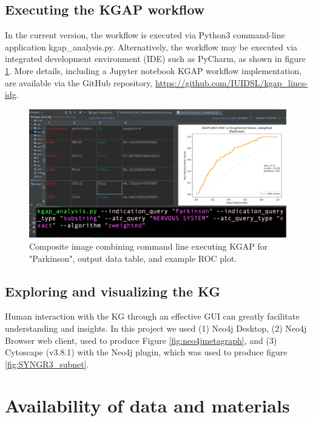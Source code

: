\subsection{Executing the KGAP workflow}

In the current version, the workflow is executed via Python3 command-line application kgap\_analysis.py. Alternatively, the workflow may be executed via integrated development environment (IDE) such as PyCharm, as shown in figure \ref{fig:pycharm}. More details, including a Jupyter notebook KGAP workflow implementation, are available via the GitHub repository, \href{https://github.com/IUIDSL/kgap\_lincs-idg}{https://github.com/IUIDSL/kgap\_lincs-idg}. 

\begin{figure}
	\includegraphics[width=\textwidth]{figures/kgap/KGAP_PyCharm_composite2.png}
	\caption{Composite image combining command line executing KGAP for "Parkinson",  output data table, and example ROC plot.}
	\label{fig:pycharm}
\end{figure}

\subsection{Exploring and visualizing the KG}

Human interaction with the KG through an effective GUI can greatly facilitate understanding and insights.  In this project we used (1) Neo4j Desktop, (2) Neo4j  Browser web client, used to produce Figure \ref{fig:neo4jmetagraph}, and (3) Cytoscape (v3.8.1) with the Neo4j plugin, which was used to produce figure \ref{fig:SYNGR3_subnet}.  

\section{Availability of data and materials}

